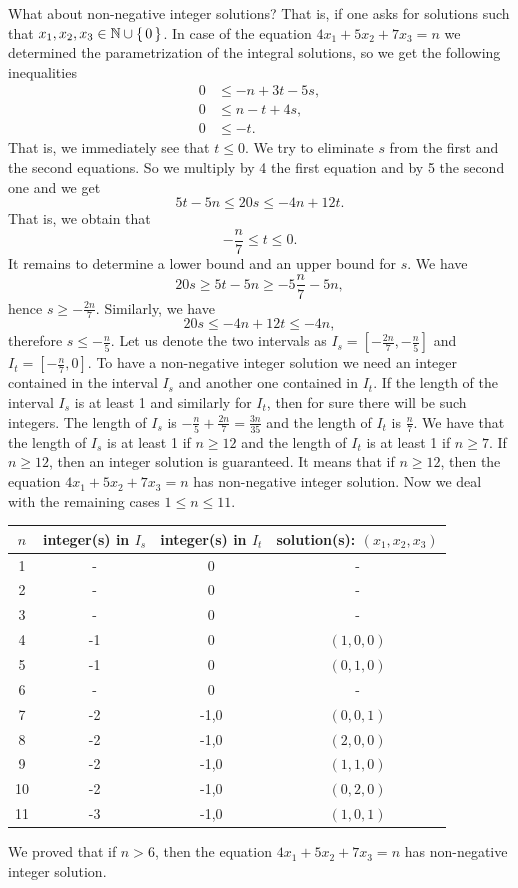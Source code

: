 What about non-negative integer solutions? That is, if one asks for solutions such that $x_1,x_2,x_3\in\mathbb{N}\cup\left\{\,0\,\right\}$.
In case of the equation $4x_1+5x_2+7x_3=n$ we determined the parametrization of the integral solutions, so we get the
following inequalities
\begin{align*}
0&\leq -n+3t-5s,\\
0&\leq n-t+4s,\\
0&\leq -t.
\end{align*}
That is, we immediately see that $t\leq 0$. We try to eliminate $s$ from the first and the second equations. So we multiply by 4 the first equation
and by 5 the second one and we get
$$
5t-5n\leq 20s\leq -4n+12t.
$$
That is, we obtain that
$$
-\frac{n}{7}\leq t\leq 0.
$$
It remains to determine a lower bound and an upper bound for $s$. We have
$$
20s\geq 5t-5n\geq -5\frac{n}{7}-5n,
$$
hence $s\geq -\frac{2n}{7}$. Similarly, we have
$$
20s\leq -4n+12t\leq -4n,
$$
therefore $s\leq -\frac{n}{5}$. Let us denote the two intervals as $I_s=[-\frac{2n}{7},-\frac{n}{5}]$ and $I_t=[-\frac{n}{7},0]$.
To have a non-negative integer solution we need an integer contained in the interval $I_s$ and another one contained in $I_t$.
If the length of the interval $I_s$ is at least 1 and similarly for $I_t$, then for sure there will be such integers.
The length of $I_s$ is $-\frac{n}{5}+\frac{2n}{7}=\frac{3n}{35}$ and the length of $I_t$ is $\frac{n}{7}$. We have that the length
of $I_s$ is at least 1 if $n\geq 12$ and the length of $I_t$ is at least 1 if $n\geq 7$. If $n\geq 12$, then an integer solution
is guaranteed. It means that if $n\geq 12$, then the equation $4x_1+5x_2+7x_3=n$ has non-negative integer solution. Now we deal with
the remaining cases $1\leq n\leq 11.$
\begin{center}
\begin{tabular}{|c|c|c|c|}
\hline
$n$ & integer(s) in $I_s$ & integer(s) in $I_t$ & solution(s): $(x_1,x_2,x_3)$\\
\hline
1 &- & 0 & -\\
\hline
2 &- & 0 & -\\
\hline
3 &- & 0 & -\\
\hline
4 &-1 & 0 & $(1,0,0)$\\
\hline
5 &-1 & 0 & $(0,1,0)$\\
\hline
6 &- & 0 & -\\
\hline
7 &-2 &-1,0 & $(0,0,1)$\\
\hline
8 &-2 & -1,0 & $(2,0,0)$\\
\hline
9 &-2 &-1,0  & $(1,1,0)$\\
\hline
10&-2 &-1,0  & $(0,2,0)$\\
\hline
11&-3 &-1,0  & $(1,0,1)$\\
\hline
\end{tabular}
\end{center}
We proved that if $n>6$, then the equation $4x_1+5x_2+7x_3=n$ has non-negative integer solution.


